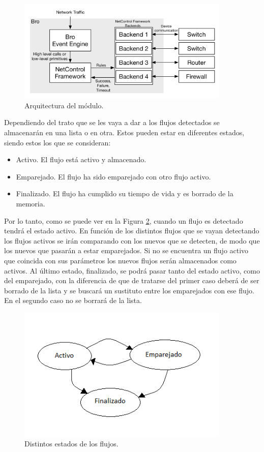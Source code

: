 \begin{figure}[H]
  \includegraphics[width=0.9\textwidth]{imagenes/netcarquitectura.png}
  \centering
  \caption{Arquitectura del módulo.}\label{fig.sistema}
\end{figure}

\intro Dependiendo del trato que se les vaya a dar a los flujos detectados se almacenarán en una lista o en otra. Estos pueden estar 
en diferentes estados, siendo estos los que se consideran:

\begin{itemize}
\item Activo. El flujo está activo y almacenado.
\item Emparejado. El flujo ha sido emparejado con otro flujo activo.
\item Finalizado. El flujo ha cumplido su tiempo de vida y es borrado de la memoria.
\end{itemize}

\intro Por lo tanto, como se puede ver en la Figura \ref{fig.flujos}, cuando un flujo es detectado tendrá el estado activo. En función 
de los distintos flujos que se vayan detectando los flujos activos se irán comparando con los nuevos que se detecten, de modo que los 
nuevos que pasarán a estar emparejados. Si no se encuentra un flujo activo que coincida con sus parámetros los nuevos flujos serán 
almacenados como activos. Al último estado, finalizado, se podrá pasar tanto del estado activo, como del emparejado, con la diferencia 
de que de tratarse del primer caso deberá de ser borrado de la lista y se buscará un sustituto entre los emparejados con ese flujo. En 
el segundo caso no se borrará de la lista.

\begin{figure}[H]
  \includegraphics[width=0.9\textwidth]{imagenes/flujos.png}
  \centering
  \caption{Distintos estados de los flujos.}\label{fig.flujos}
\end{figure}


